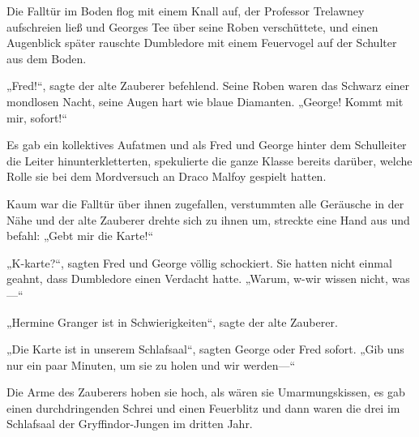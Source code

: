 Die Falltür im Boden flog mit einem Knall auf, der Professor Trelawney aufschreien ließ und Georges Tee über seine Roben verschüttete, und einen Augenblick später rauschte Dumbledore mit einem Feuervogel auf der Schulter aus dem Boden.

„Fred!“, sagte der alte Zauberer befehlend. Seine Roben waren das Schwarz einer mondlosen Nacht, seine Augen hart wie blaue Diamanten.
„George! Kommt mit mir, sofort!“

Es gab ein kollektives Aufatmen und als Fred und George hinter dem Schulleiter die Leiter hinunterkletterten, spekulierte die ganze Klasse bereits darüber, welche Rolle sie bei dem Mordversuch an Draco Malfoy gespielt hatten.

Kaum war die Falltür über ihnen zugefallen, verstummten alle Geräusche in der Nähe und der alte Zauberer drehte sich zu ihnen um, streckte eine Hand aus und befahl:
„Gebt mir die Karte!“

„K-karte?“, sagten Fred und George völlig schockiert. Sie hatten nicht einmal geahnt, dass Dumbledore einen Verdacht hatte.
„Warum, w-wir wissen nicht, was—“

„Hermine Granger ist in Schwierigkeiten“, sagte der alte Zauberer.

„Die Karte ist in unserem Schlafsaal“, sagten George oder Fred sofort.
„Gib uns nur ein paar Minuten, um sie zu holen und wir werden—“

Die Arme des Zauberers hoben sie hoch, als wären sie Umarmungskissen, es gab einen durchdringenden Schrei und einen Feuerblitz und dann waren die drei im Schlafsaal der Gryffindor-Jungen im dritten Jahr.


